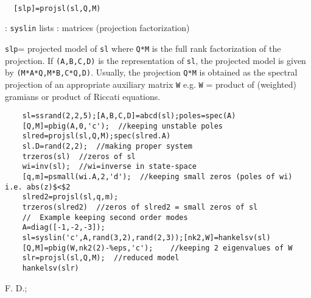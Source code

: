 \begin{mandesc}
   \\ %
\end{mandesc}
\begin{calling_sequence}
\begin{verbatim}
  [slp]=projsl(sl,Q,M)  
\end{verbatim}
\end{calling_sequence}
\begin{parameters}
  \begin{varlist}
    : \verb!syslin! lists
    : matrices (projection factorization)
  \end{varlist}
\end{parameters}
\begin{mandescription}
  \verb!slp!= projected model of \verb!sl! where \verb!Q*M! is the full rank 
  factorization of the projection.
  If \verb!(A,B,C,D)! is the representation of \verb!sl!, the projected model
  is given by \verb!(M*A*Q,M*B,C*Q,D)!.
  Usually, the projection \verb!Q*M! is obtained as the spectral projection
  of an appropriate auxiliary matrix \verb!W! e.g. \verb!W! = product
  of (weighted) gramians or product of Riccati equations.
\end{mandescription}
\begin{examples}
  \begin{Verbatim}
    sl=ssrand(2,2,5);[A,B,C,D]=abcd(sl);poles=spec(A)
    [Q,M]=pbig(A,0,'c');  //keeping unstable poles
    slred=projsl(sl,Q,M);spec(slred.A)
    sl.D=rand(2,2);  //making proper system
    trzeros(sl)  //zeros of sl
    wi=inv(sl);  //wi=inverse in state-space
    [q,m]=psmall(wi.A,2,'d');  //keeping small zeros (poles of wi) i.e. abs(z)$<$2
    slred2=projsl(sl,q,m);
    trzeros(slred2)  //zeros of slred2 = small zeros of sl
    //  Example keeping second order modes
    A=diag([-1,-2,-3]);
    sl=syslin('c',A,rand(3,2),rand(2,3));[nk2,W]=hankelsv(sl)
    [Q,M]=pbig(W,nk2(2)-%eps,'c');    //keeping 2 eigenvalues of W
    slr=projsl(sl,Q,M);  //reduced model
    hankelsv(slr)
  \end{Verbatim}
\end{examples}
\begin{manseealso}
\end{manseealso}
\begin{authors}
  F. D.;   
\end{authors}
